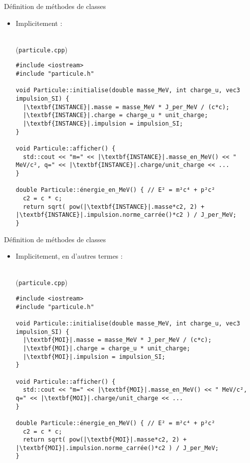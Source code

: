 \documentclass[c]{beamer}
\begin{document}
\begin{frame}[fragile]{Définition de méthodes de classes}

\begin{itemize}
\item Implicitement :\\\ \\
\begin{cbox}[][lwuc](\texttt{particule.cpp})
\begin{verbatim}
#include <iostream>
#include "particule.h"

void Particule::initialise(double masse_MeV, int charge_u, vec3 impulsion_SI) {
  |\textbf{INSTANCE}|.masse = masse_MeV * J_per_MeV / (c*c);
  |\textbf{INSTANCE}|.charge = charge_u * unit_charge;
  |\textbf{INSTANCE}|.impulsion = impulsion_SI;
}

void Particule::afficher() {
  std::cout << "m=" << |\textbf{INSTANCE}|.masse_en_MeV() << " MeV/c², q=" << |\textbf{INSTANCE}|.charge/unit_charge << ...
}

double Particule::énergie_en_MeV() { // E² = m²c⁴ + p²c²
  c2 = c * c;
  return sqrt( pow(|\textbf{INSTANCE}|.masse*c2, 2) + |\textbf{INSTANCE}|.impulsion.norme_carrée()*c2 ) / J_per_MeV;
}
\end{verbatim}
\end{cbox}
\end{itemize}

\end{frame}


\begin{frame}[fragile]{Définition de méthodes de classes}

\begin{itemize}
\item Implicitement, en d'autres termes :\\\ \\
\begin{cbox}[][lwuc](\texttt{particule.cpp})
\begin{verbatim}
#include <iostream>
#include "particule.h"

void Particule::initialise(double masse_MeV, int charge_u, vec3 impulsion_SI) {
  |\textbf{MOI}|.masse = masse_MeV * J_per_MeV / (c*c);
  |\textbf{MOI}|.charge = charge_u * unit_charge;
  |\textbf{MOI}|.impulsion = impulsion_SI;
}

void Particule::afficher() {
  std::cout << "m=" << |\textbf{MOI}|.masse_en_MeV() << " MeV/c², q=" << |\textbf{MOI}|.charge/unit_charge << ...
}

double Particule::énergie_en_MeV() { // E² = m²c⁴ + p²c²
  c2 = c * c;
  return sqrt( pow(|\textbf{MOI}|.masse*c2, 2) + |\textbf{MOI}|.impulsion.norme_carrée()*c2 ) / J_per_MeV;
}
\end{verbatim}
\end{cbox}
\end{itemize}

\end{frame}
\end{document}
